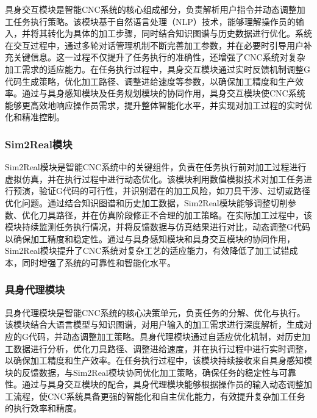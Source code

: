 \documentclass[preprint,12pt]{elsarticle}
\begin{document}
具身交互模块是智能CNC系统的核心组成部分，负责解析用户指令并动态调整加工任务执行策略。该模块基于自然语言处理（NLP）技术，能够理解操作员的输入，并将其转化为具体的加工步骤，同时结合知识图谱与历史数据进行优化。系统在交互过程中，通过多轮对话管理机制不断完善加工参数，并在必要时引导用户补充关键信息。这一过程不仅提升了任务执行的准确性，还增强了CNC系统对复杂加工需求的适应能力。在任务执行过程中，具身交互模块通过实时反馈机制调整G代码生成策略，优化加工路径、调整进给速度等参数，以确保加工精度和生产效率。通过与具身感知模块及任务规划模块的协同作用，具身交互模块使CNC系统能够更高效地响应操作员需求，提升整体智能化水平，并实现对加工过程的实时优化和精准控制。


\subsubsection{Sim2Real模块}

Sim2Real模块是智能CNC系统中的关键组件，负责在任务执行前对加工过程进行虚拟仿真，并在执行过程中进行动态优化。该模块利用数值模拟技术对加工任务进行预演，验证G代码的可行性，并识别潜在的加工风险，如刀具干涉、过切或路径优化问题。通过结合知识图谱和历史加工数据，Sim2Real模块能够调整切削参数、优化刀具路径，并在仿真阶段修正不合理的加工策略。在实际加工过程中，该模块持续监测任务执行情况，并将反馈数据与仿真结果进行对比，动态调整G代码以确保加工精度和稳定性。通过与具身感知模块和具身交互模块的协同作用，Sim2Real模块提升了CNC系统对复杂工艺的适应能力，有效降低了加工试错成本，同时增强了系统的可靠性和智能化水平。


\subsubsection{具身代理模块}

具身代理模块是智能CNC系统的核心决策单元，负责任务的分解、优化与执行。该模块结合大语言模型与知识图谱，对用户输入的加工需求进行深度解析，生成对应的G代码，并动态调整加工策略。具身代理模块通过自适应优化机制，对历史加工数据进行分析，优化刀具路径、调整进给速度，并在执行过程中进行实时调整，以确保加工精度和生产效率。在任务执行过程中，该模块持续接收来自具身感知模块的反馈数据，与Sim2Real模块协同优化加工策略，确保任务的稳定性与可靠性。通过与具身交互模块的配合，具身代理模块能够根据操作员的输入动态调整加工流程，使CNC系统具备更强的智能化和自主优化能力，有效提升复杂加工任务的执行效率和精度。
\end{document}
